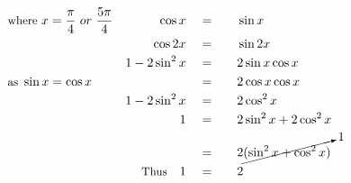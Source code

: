 \begin{alignat*}{5}
&\small\text{where }x=\frac{\pi}{4}~or~\frac{5\pi}{4}&\cos{x}\quad&=\quad&&\sin{x}\\
&\,&\cos{2x}\quad&=&&\sin{2x}\\
&\,&1-2\sin^2{x}\quad&=&&2\sin{x}\cos{x}\\
&\small\text{as }\sin{x}=\cos{x}&\,&=&&2\cos{x}\cos{x}\\
&\,&1-2\sin^2{x}\quad&=&&2\cos^2{x}\\
&\,&1\quad&=&&2\sin^2{x}+2\cos^2{x}\\
&\,&\,&=&&2\cancelto{1}{(\sin^2{x+\cos^2{x}})}\\
&\,&\small\text{Thus}\normalsize\quad1\quad&=&&2
\end{alignat*}
